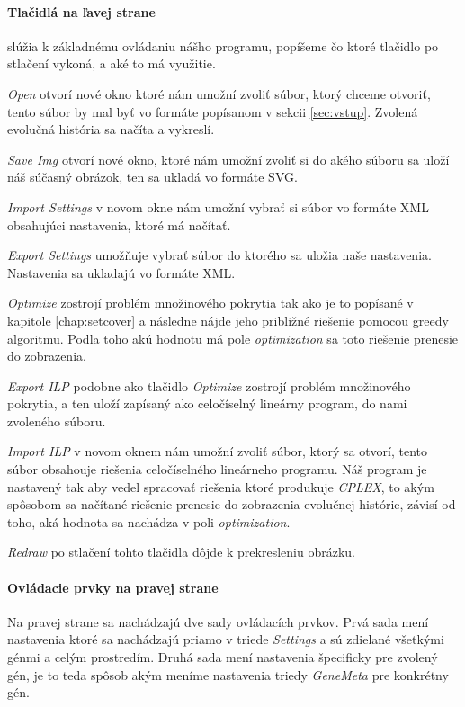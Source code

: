\paragraph{Tlačidlá na ľavej strane} slúžia k základnému ovládaniu nášho programu, popíšeme čo ktoré tlačidlo po stlačení vykoná,
a aké to má využitie.

\emph{Open} otvorí nové okno ktoré nám umožní zvoliť súbor, ktorý chceme otvoriť, tento súbor by mal byť vo formáte popísanom v sekcii \ref{sec:vstup}. 
 Zvolená evolučná história sa načíta a vykreslí. 
 
\emph{Save Img} otvorí nové okno, ktoré nám umožní zvoliť si do akého súboru sa uloží náš súčasný obrázok, ten sa ukladá vo formáte SVG.

\emph{Import Settings} v novom okne nám umožní vybrať si súbor vo formáte XML obsahujúci nastavenia, ktoré má načítať.

\emph{Export Settings} umožňuje vybrať súbor do ktorého sa uložia naše nastavenia. Nastavenia sa ukladajú vo formáte XML.

\emph{Optimize} zostrojí problém množinového pokrytia tak ako je to popísané v kapitole \ref{chap:setcover}
a následne nájde jeho približné riešenie pomocou greedy algoritmu.
Podla toho akú hodnotu má pole \emph{optimization} sa toto riešenie prenesie do zobrazenia.

\emph{Export ILP} podobne ako tlačidlo \emph{Optimize} zostrojí problém množinového pokrytia, 
a ten uloží zapísaný ako celočíselný lineárny program, do nami zvoleného súboru.

\emph{Import ILP} v novom oknem nám umožní zvoliť súbor, ktorý sa otvorí, tento súbor obsahouje riešenia celočíselného lineárneho programu.
 Náš program je nastavený tak aby vedel spracovať riešenia ktoré produkuje \emph{CPLEX}, to akým spôsobom sa načítané riešenie prenesie do 
 zobrazenia evolučnej histórie, závisí od toho, aká hodnota sa nachádza v poli \emph{optimization}.
 
\emph{Redraw} po stlačení tohto tlačidla dôjde k prekresleniu obrázku.
\paragraph{Ovládacie prvky na pravej strane}
Na pravej strane sa nachádzajú dve sady ovládacích prvkov. Prvá sada mení nastavenia ktoré sa 
nachádzajú priamo v triede \emph{Settings} a sú zdielané všetkými génmi a celým prostredím.
Druhá sada mení nastavenia špecificky pre zvolený gén, je to teda spôsob akým meníme nastavenia triedy
\emph{GeneMeta} pre konkrétny gén.
